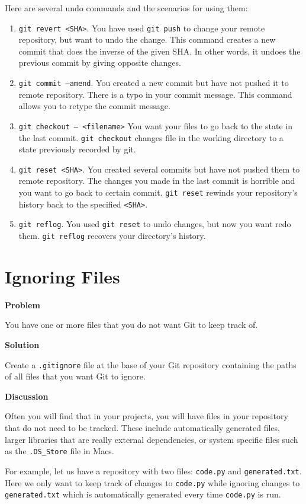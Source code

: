 \documentclass[12pt]{report}
\newcommand\code[1]{{\color{blue}\texttt{#1}}}
\begin{document}
Here are several undo commands and the scenarios for using them:

\begin{enumerate}
  \item \code{git revert <SHA>}. You have used \code{git push} to change your remote repository, but want to undo the change. This command creates a new commit that does the inverse of the given SHA. In other words, it undoes the previous commit by giving opposite changes.
  \item \code{git commit --amend}. You created a new commit but have not pushed it to remote repository. There is a typo in your commit message. This command allows you to retype the commit message.
  \item \code{git checkout -- <filename>} You want your files to go back to the state in the last commit. \code{git checkout} changes file in the working directory to a state previously recorded by git.
  \item \code{git reset <SHA>}. You created several commits but have not pushed them to remote repository. The changes you made in the last commit is horrible and you want to go back to certain commit. \code{git reset} rewinds your repository's history back to the specified \code{<SHA>}.
  \item \code{git reflog}. You used \code{git reset} to undo changes, but now you want redo them. \code{git reflog} recovers your directory's history.
\end{enumerate}

\section{Ignoring Files}

\textbf{Problem}

You have one or more files that you do not want Git to keep track of.

\textbf{Solution}

Create a \texttt{.gitignore} file at the base of your Git repository containing the paths of all files that you want Git to ignore.

\textbf{Discussion}

Often you will find that in your projects, you will have files in your repository that do not need to be tracked.  These include automatically generated files, larger libraries that are really external dependencies, or system specific files such as the \texttt{.DS\_Store} file in Macs.

For example, let us have a repository with two files: \texttt{code.py} and \texttt{generated.txt}.  Here we only want to keep track of changes to \texttt{code.py} while ignoring changes to \texttt{generated.txt} which is automatically generated every time \texttt{code.py} is run.
\end{document}
